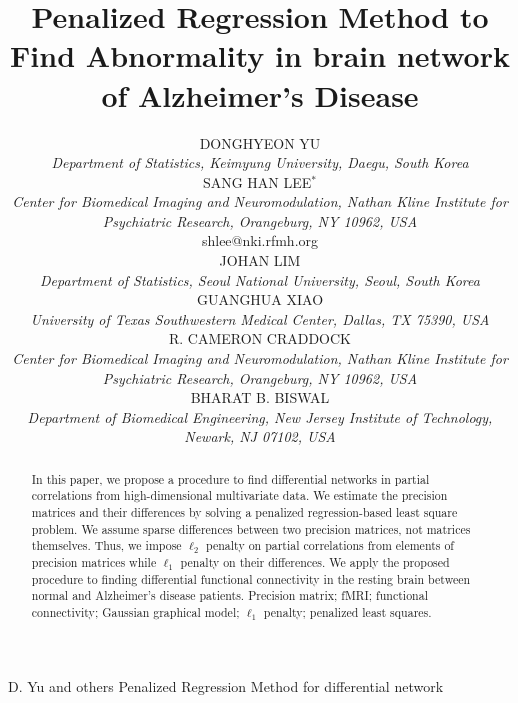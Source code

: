 \documentclass[useAMS,usenatbib,referee]{bio}
\begin{document}
\title{Penalized Regression Method to Find Abnormality in brain network of Alzheimer's Disease}

\author{DONGHYEON YU\\[2pt] 
\textit{Department of Statistics, Keimyung University, Daegu, South Korea}
\\[2pt]
SANG HAN LEE$^{\ast}$\\ [2pt]
\textit{ 
Center for Biomedical Imaging and Neuromodulation, Nathan Kline Institute for Psychiatric Research, Orangeburg, NY 10962, USA}
\\[2pt]
{shlee@nki.rfmh.org}\\[2pt]
JOHAN LIM \\[2pt]
\textit{Department of Statistics, Seoul National University, Seoul, South Korea} \\[2pt]
GUANGHUA XIAO\\[2pt]
\textit{ 
University of Texas Southwestern Medical Center, Dallas, TX 75390, USA}
\\[2pt]
R. CAMERON CRADDOCK\\ [2pt]
\textit{ 
Center for Biomedical Imaging and Neuromodulation, Nathan Kline Institute for Psychiatric Research, Orangeburg, NY 10962, USA}
\\[2pt]
BHARAT B. BISWAL  \\[2pt]
\textit{ 
Department of Biomedical Engineering, New Jersey Institute of Technology, Newark, NJ 07102, USA
}
\\[2pt]
}

\markboth%
{D. Yu and others}
{Penalized Regression Method for differential network}

\maketitle



\begin{abstract}
{In this paper, we propose a procedure to find differential networks in partial correlations from high-dimensional multivariate data. We estimate the precision matrices and their differences by solving a penalized regression-based least square problem. We assume sparse differences between two precision matrices, not matrices themselves. Thus, we impose $\ell_2$ penalty on
partial correlations from elements of precision matrices while $\ell_1$ penalty on their differences. We apply the proposed procedure to finding differential functional connectivity in the resting brain between normal and Alzheimer's disease patients.}
{ Precision matrix; fMRI; functional connectivity; Gaussian graphical model; $\ell_1$ penalty; penalized least squares.}
\end{abstract}
\end{document}
